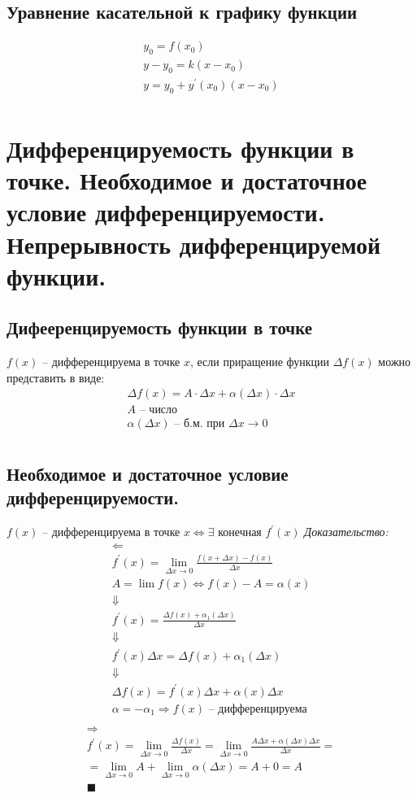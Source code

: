 \documentclass[12pt, fleqn]{article}
\begin{document}
\subsection{Уравнение касательной к графику функции}
\begin{multline*}
	y_0=f(x_0)\\
	y-y_0=k(x-x_0)\\
	y=y_0+y^\prime(x_0)(x-x_0)\\
\end{multline*}
\section{Дифференцируемость функции в точке. Необходимое и достаточное условие дифференцируемости.  Непрерывность дифференцируемой функции.}
\subsection{Дифееренцируемость функции в точке}
$f(x)$ -- дифференцируема в точке $x$, если приращение функции $\varDelta f(x)$ можно представить в виде:
\begin{multline*}
\varDelta f(x)=A\cdot \varDelta x+\alpha (\varDelta x)\cdot \varDelta x \\
A\text{ -- число}\\
\alpha(\varDelta x) \text{ -- б.м. при }\varDelta x \to 0\\
\end{multline*}
\subsection{Необходимое и достаточное условие дифференцируемости.}
$f(x)$ -- дифференцируема в точке $x \Leftrightarrow \exists$ конечная $f^\prime(x)$
\textit{Доказательство:}
\begin{multline*}
	\boxed{\Leftarrow}\\
	f^\prime(x)=\lim_{\varDelta x \to 0}\frac{f(x+ \varDelta x)-f(x)}{\varDelta x}\\
	A=\lim f(x) \Leftrightarrow f(x)-A=\alpha(x)\\
	\Downarrow\\
	f^\prime(x)=\frac{\varDelta f(x)+\alpha_1(\varDelta x)}{\varDelta x}\\
	\Downarrow\\
	f^\prime(x)\varDelta x=\varDelta f(x)+\alpha_1(\varDelta x)\\
	\Downarrow\\
	\varDelta f(x)=f^\prime(x)\varDelta x+ \alpha(x)\varDelta x\\
	\alpha = -\alpha_1 \Rightarrow f(x) \text{ -- дифференцируема}\\
	\end{multline*}
	\begin{multline*}
		\boxed{\Rightarrow}\\
		f^\prime(x)=\lim_{\varDelta x \to 0}\frac{\varDelta f(x)}{\varDelta x}=\lim_{\varDelta x \to 0} \frac{A\varDelta x + \alpha(\varDelta x) \varDelta x}{\varDelta x}=\\
		=\lim_{\varDelta x \to 0} A + \lim_{\varDelta x \to 0} \alpha(\varDelta x)= A + 0 = A\\
		\blacksquare\\
	\end{multline*}
\end{document}
